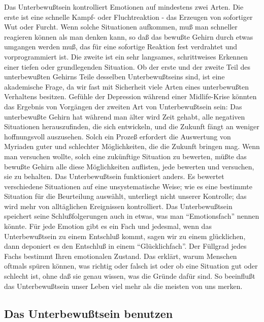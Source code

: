 Das Unterbewußtsein kontrolliert Emotionen auf mindestens zwei Arten.
Die erste ist eine schnelle Kampf- oder Fluchtreaktion - das Erzeugen von sofortiger Wut oder Furcht.
Wenn solche Situationen aufkommen, muß man schneller reagieren können als man denken kann, so daß das bewußte Gehirn durch etwas umgangen werden muß, das für eine sofortige Reaktion fest verdrahtet und vorprogrammiert ist.
Die zweite ist ein sehr langsames, schrittweises Erkennen einer tiefen oder grundlegenden Situation.
Ob der erste und der zweite Teil des unterbewußten Gehirns Teile desselben Unterbewußtseins sind, ist eine akademische Frage, da wir fast mit Sicherheit viele Arten eines unterbewußten Verhaltens besitzen.
Gefühle der Depression während einer Midlife-Krise könnten das Ergebnis von Vorgängen der zweiten Art von Unterbewußtsein sein: Das unterbewußte Gehirn hat während man älter wird Zeit gehabt, alle negativen Situationen herauszufinden, die sich entwickeln, und die Zukunft fängt an weniger hoffnungsvoll auszusehen.
Solch ein Prozeß erfordert die Auswertung von Myriaden guter und schlechter Möglichkeiten, die die Zukunft bringen mag.
Wenn man versuchen wollte, solch eine zukünftige Situation zu bewerten, müßte das bewußte Gehirn alle diese Möglichkeiten auflisten, jede bewerten und versuchen, sie zu behalten.
Das Unterbewußtsein funktioniert anders.
Es bewertet verschiedene Situationen auf eine unsystematische Weise; wie es eine bestimmte Situation für die Beurteilung auswählt, unterliegt nicht unserer Kontrolle; das wird mehr von alltäglichen Ereignissen kontrolliert.
Das Unterbewußtsein speichert seine Schlußfolgerungen auch in etwas, was man \enquote{Emotionsfach} nennen könnte.
Für jede Emotion gibt es ein Fach und jedesmal, wenn das Unterbewußtsein zu einem Entschluß kommt, sagen wir zu einem glücklichen, dann deponiert es den Entschluß in einem \enquote{Glücklichfach}.
Der Füllgrad jedes Fachs bestimmt Ihren emotionalen Zustand.
Das erklärt, warum Menschen oftmals spüren können, was richtig oder falsch ist oder ob eine Situation gut oder schlecht ist, ohne daß sie genau wissen, was die Gründe dafür sind.
So beeinflußt das Unterbewußtsein unser Leben viel mehr als die meisten von uns merken.


\subsection{Das Unterbewußtsein benutzen}\hypertarget{c3_6c}{}

